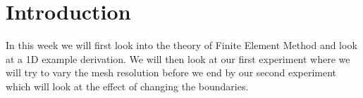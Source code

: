 \section{Introduction}
In this week we will first look into the theory of Finite Element Method and look at a 1D example derivation. We will then look at our first experiment where we will try to vary the mesh resolution before we end by our second experiment which will look at the effect of changing the boundaries.